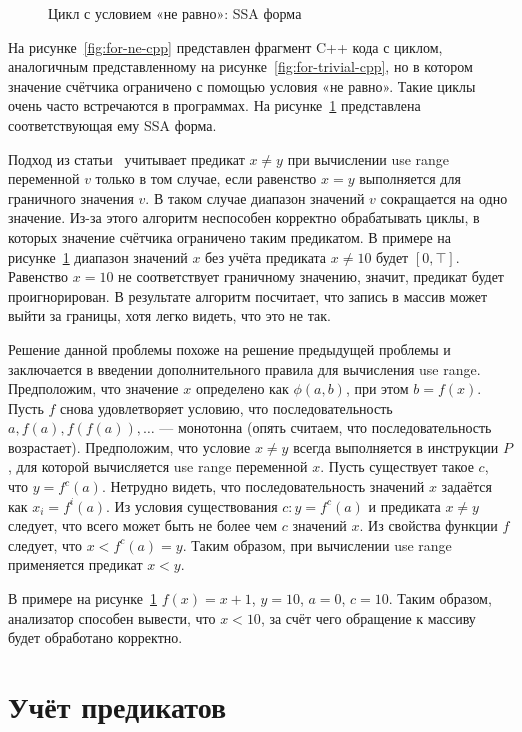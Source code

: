 \begin{figure}
    \caption{Цикл с условием «не равно»: SSA форма}
    \label{fig:for-ne-ssa}
\end{figure}

На рисунке~\ref{fig:for-ne-cpp} представлен фрагмент C++ кода с
циклом, аналогичным представленному на
рисунке~\ref{fig:for-trivial-cpp}, но в котором значение счётчика
ограничено с помощью условия «не равно». Такие циклы очень часто
встречаются в программах.  На рисунке~\ref{fig:for-ne-ssa}
представлена соответствующая ему SSA форма.

Подход из статьи~\cite{li2010practical} учитывает предикат $x \neq y$
при вычислении use range переменной $v$ только в том случае, если
равенство $x = y$ выполняется для граничного значения $v$. В таком
случае диапазон значений $v$ сокращается на одно значение. Из-за этого
алгоритм неспособен корректно обрабатывать циклы, в которых значение
счётчика ограничено таким предикатом. В примере на
рисунке~\ref{fig:for-ne-ssa} диапазон значений $x$ без учёта предиката $x \neq
10$ будет $[0, \top]$. Равенство $x = 10$ не соответствует
граничному значению, значит, предикат будет проигнорирован. В
результате алгоритм посчитает, что запись в массив может выйти за
границы, хотя легко видеть, что это не так.

Решение данной проблемы похоже на решение предыдущей проблемы и
заключается в введении дополнительного правила для вычисления use
range. Предположим, что значение $x$ определено как $\phi(a, b)$, при
этом $b = f(x)$. Пусть $f$ снова удовлетворяет условию, что
последовательность $a, f(a), f(f(a)), \dots$ --- монотонна (опять
считаем, что последовательность возрастает). Предположим, что условие
$x \neq y$ всегда выполняется в инструкции $P$, для которой
вычисляется use range переменной $x$. Пусть существует такое $c$, что
$y = f^c(a)$. Нетрудно видеть, что последовательность значений $x$
задаётся как $x_i = f^i(a)$. Из условия существования $c: y = f^c(a)$
и предиката $x \neq y$ следует, что всего может быть не более чем $c$
значений $x$. Из свойства функции $f$ следует, что $x < f^c(a) =
y$. Таким образом, при вычислении use range применяется предикат
$x < y$.

В примере на рисунке~\ref{fig:for-ne-ssa} $f(x) = x + 1$, $y = 10$,
$a = 0$, $c = 10$. Таким образом, анализатор способен вывести, что
$x < 10$, за счёт чего обращение к массиву будет обработано корректно.

\FloatBarrier

\section{Учёт предикатов}

